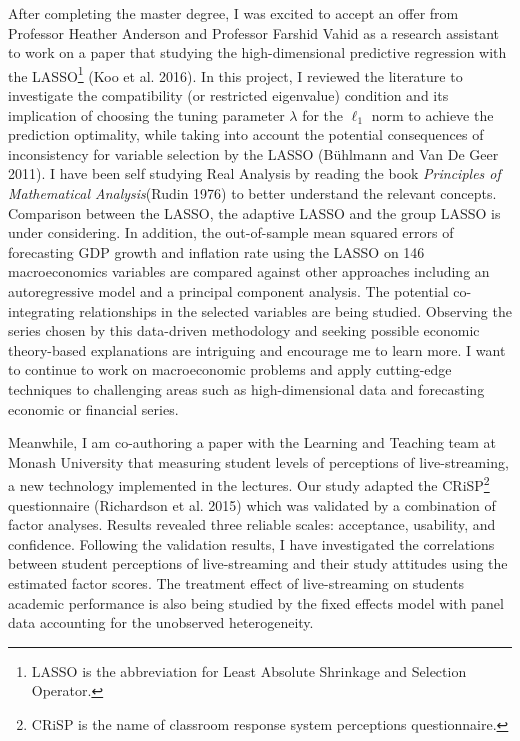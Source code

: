 \documentclass[12pt,]{article}
\let\rmarkdownfootnote\footnote%
\def\footnote{\protect\rmarkdownfootnote}
\begin{document}
After completing the master degree, I was excited to accept an offer
from Professor Heather Anderson and Professor Farshid Vahid as a
research assistant to work on a paper that studying the high-dimensional
predictive regression with the LASSO\footnote{LASSO is the abbreviation
  for Least Absolute Shrinkage and Selection Operator.} (Koo et al.
2016). In this project, I reviewed the literature to investigate the
compatibility (or restricted eigenvalue) condition and its implication
of choosing the tuning parameter \(\lambda\) for the \(\ell_1\) norm to
achieve the prediction optimality, while taking into account the
potential consequences of inconsistency for variable selection by the
LASSO (Bühlmann and Van De Geer 2011). I have been self studying Real
Analysis by reading the book \emph{Principles of Mathematical
Analysis}(Rudin 1976) to better understand the relevant concepts.
Comparison between the LASSO, the adaptive LASSO and the group LASSO is
under considering. In addition, the out-of-sample mean squared errors of
forecasting GDP growth and inflation rate using the LASSO on 146
macroeconomics variables are compared against other approaches including
an autoregressive model and a principal component analysis. The
potential co-integrating relationships in the selected variables are
being studied. Observing the series chosen by this data-driven
methodology and seeking possible economic theory-based explanations are
intriguing and encourage me to learn more. I want to continue to work on
macroeconomic problems and apply cutting-edge techniques to challenging
areas such as high-dimensional data and forecasting economic or
financial series.

Meanwhile, I am co-authoring a paper with the Learning and Teaching team
at Monash University that measuring student levels of perceptions of
live-streaming, a new technology implemented in the lectures. Our study
adapted the CRiSP\footnote{CRiSP is the name of classroom response
  system perceptions questionnaire.} questionnaire (Richardson et al.
2015) which was validated by a combination of factor analyses. Results
revealed three reliable scales: acceptance, usability, and confidence.
Following the validation results, I have investigated the correlations
between student perceptions of live-streaming and their study attitudes
using the estimated factor scores. The treatment effect of
live-streaming on students academic performance is also being studied by
the fixed effects model with panel data accounting for the unobserved
heterogeneity.
\end{document}
